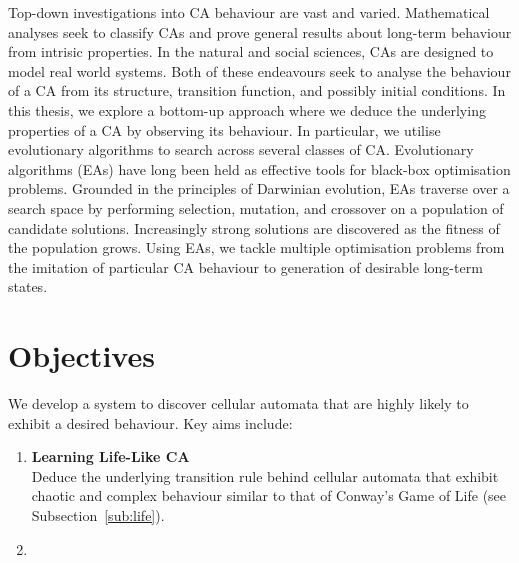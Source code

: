 Top-down investigations into CA behaviour are vast and varied. Mathematical analyses seek to classify CAs and prove general results about long-term behaviour from intrisic properties. In the natural and social sciences, CAs are designed to model real world systems. Both of these endeavours seek to analyse the behaviour of a CA from its structure, transition function, and possibly initial conditions. In this thesis, we explore a bottom-up approach where we deduce the underlying properties of a CA by observing its behaviour. In particular, we utilise evolutionary algorithms to search across several classes of CA. Evolutionary algorithms (EAs) have long been held as effective tools for black-box optimisation problems. Grounded in the principles of Darwinian evolution, EAs traverse over a search space by performing selection, mutation, and crossover on a population of candidate solutions. Increasingly strong solutions are discovered as the fitness of the population grows. Using EAs, we tackle multiple optimisation problems from the imitation of particular CA behaviour to generation of desirable long-term states.\\

\section{Objectives}
We develop a system to discover cellular automata that are highly likely to exhibit a desired behaviour. Key aims include:
\begin{enumerate}
    \item \textbf{Learning Life-Like CA}\\
    Deduce the underlying transition rule behind cellular automata that exhibit chaotic and complex behaviour similar to that of Conway's Game of Life (see Subsection~\ref{sub:life}).
    \item 
\end{enumerate}

